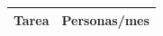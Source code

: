 \documentclass[xcolor=table,xcolor=x11names]{beamer}
\begin{document}
\begin{frame}{\subsecname}



\footnotesize
\begin{table}
\begin{adjustbox}{width=.7\textwidth,center}

\begin{tabular}{ p{12cm} | p{2cm}  } 

\toprule

{\bf Tarea} &  {\bf Personas/mes} \\ \hline



\end{tabular}
\end{adjustbox}
\end{table}
\end{frame}
\end{document}
